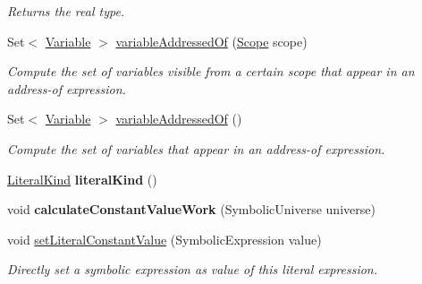 \begin{DoxyCompactItemize}
\begin{DoxyCompactList}\small\item\em Returns the real type. \end{DoxyCompactList}\item 
Set$<$ \hyperlink{interfaceedu_1_1udel_1_1cis_1_1vsl_1_1civl_1_1model_1_1IF_1_1variable_1_1Variable}{Variable} $>$ \hyperlink{classedu_1_1udel_1_1cis_1_1vsl_1_1civl_1_1model_1_1common_1_1expression_1_1CommonRealLiteralExpression_a0bfe028fb9c350199c0550fee9dc07a2}{variable\+Addressed\+Of} (\hyperlink{interfaceedu_1_1udel_1_1cis_1_1vsl_1_1civl_1_1model_1_1IF_1_1Scope}{Scope} scope)
\begin{DoxyCompactList}\small\item\em Compute the set of variables visible from a certain scope that appear in an address-\/of expression. \end{DoxyCompactList}\item 
Set$<$ \hyperlink{interfaceedu_1_1udel_1_1cis_1_1vsl_1_1civl_1_1model_1_1IF_1_1variable_1_1Variable}{Variable} $>$ \hyperlink{classedu_1_1udel_1_1cis_1_1vsl_1_1civl_1_1model_1_1common_1_1expression_1_1CommonRealLiteralExpression_a841928a97aecde6043da61a77558f44d}{variable\+Addressed\+Of} ()
\begin{DoxyCompactList}\small\item\em Compute the set of variables that appear in an address-\/of expression. \end{DoxyCompactList}\item 
\hypertarget{classedu_1_1udel_1_1cis_1_1vsl_1_1civl_1_1model_1_1common_1_1expression_1_1CommonRealLiteralExpression_a8011b67b218a2bae48c204b36bee8d54}{}\hyperlink{enumedu_1_1udel_1_1cis_1_1vsl_1_1civl_1_1model_1_1IF_1_1expression_1_1LiteralExpression_1_1LiteralKind}{Literal\+Kind} {\bfseries literal\+Kind} ()\label{classedu_1_1udel_1_1cis_1_1vsl_1_1civl_1_1model_1_1common_1_1expression_1_1CommonRealLiteralExpression_a8011b67b218a2bae48c204b36bee8d54}

\item 
\hypertarget{classedu_1_1udel_1_1cis_1_1vsl_1_1civl_1_1model_1_1common_1_1expression_1_1CommonRealLiteralExpression_a9c3a3f7a32ba64aacab49d111a3b7750}{}void {\bfseries calculate\+Constant\+Value\+Work} (Symbolic\+Universe universe)\label{classedu_1_1udel_1_1cis_1_1vsl_1_1civl_1_1model_1_1common_1_1expression_1_1CommonRealLiteralExpression_a9c3a3f7a32ba64aacab49d111a3b7750}

\item 
void \hyperlink{classedu_1_1udel_1_1cis_1_1vsl_1_1civl_1_1model_1_1common_1_1expression_1_1CommonRealLiteralExpression_a2b3cff6351bd2d901b68a42ad2f978d7}{set\+Literal\+Constant\+Value} (Symbolic\+Expression value)
\begin{DoxyCompactList}\small\item\em Directly set a symbolic expression as value of this literal expression. \end{DoxyCompactList}\end{DoxyCompactItemize}
